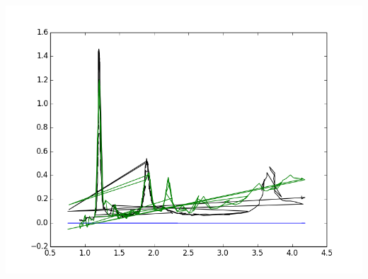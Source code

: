\documentclass{article}
\begin{document}
\includegraphics{"7,5 - From ATPE DNA Paper.png"}
\end{document}
